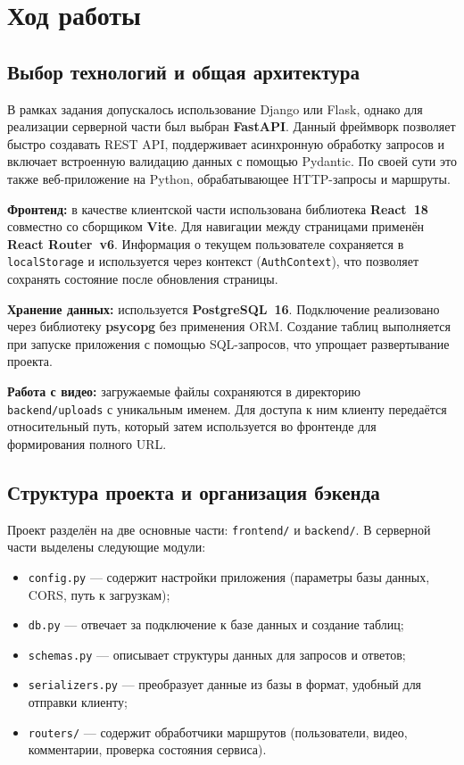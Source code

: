 \chapter{Ход работы}

\section{Выбор технологий и общая архитектура}

В рамках задания допускалось использование Django или Flask, однако для реализации серверной части был выбран \textbf{FastAPI}. Данный фреймворк позволяет быстро создавать REST API, поддерживает асинхронную обработку запросов и включает встроенную валидацию данных с помощью Pydantic. По своей сути это также веб-приложение на Python, обрабатывающее HTTP-запросы и маршруты.

\textbf{Фронтенд:} в качестве клиентской части использована библиотека \textbf{React~18} совместно со сборщиком \textbf{Vite}. Для навигации между страницами применён \textbf{React Router~v6}. Информация о текущем пользователе сохраняется в \texttt{localStorage} и используется через контекст (\texttt{AuthContext}), что позволяет сохранять состояние после обновления страницы.

\textbf{Хранение данных:} используется \textbf{PostgreSQL~16}. Подключение реализовано через библиотеку \textbf{psycopg} без применения ORM. Создание таблиц выполняется при запуске приложения с помощью SQL-запросов, что упрощает развертывание проекта.

\textbf{Работа с видео:} загружаемые файлы сохраняются в директорию \texttt{backend/uploads} с уникальным именем. Для доступа к ним клиенту передаётся относительный путь, который затем используется во фронтенде для формирования полного URL.

\section{Структура проекта и организация бэкенда}

Проект разделён на две основные части: \texttt{frontend/} и \texttt{backend/}. В серверной части выделены следующие модули:

\begin{itemize}
    \item \texttt{config.py} — содержит настройки приложения (параметры базы данных, CORS, путь к загрузкам);
    \item \texttt{db.py} — отвечает за подключение к базе данных и создание таблиц;
    \item \texttt{schemas.py} — описывает структуры данных для запросов и ответов;
    \item \texttt{serializers.py} — преобразует данные из базы в формат, удобный для отправки клиенту;
    \item \texttt{routers/} — содержит обработчики маршрутов (пользователи, видео, комментарии, проверка состояния сервиса).
\end{itemize}

